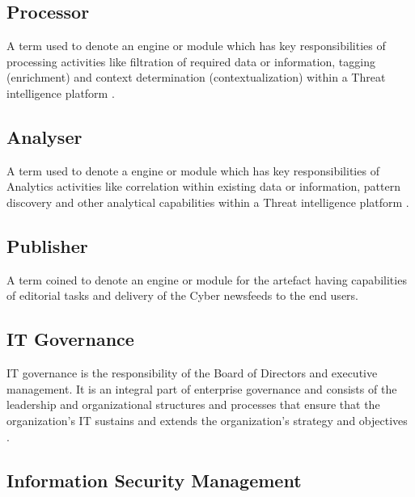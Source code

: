 
\subsection{Processor}	

A term used to denote an engine or module 
which has key responsibilities 
of processing activities like filtration
\citep{CanAtasoy2019} 
of required data or information, 
tagging (enrichment) and context determination (contextualization)
within a Threat intelligence platform
\citep{CanAtasoy2019}.

\subsection{Analyser}

A term used to denote a engine or module 
which has key responsibilities of 
Analytics
activities  
\citep{CanAtasoy2019} 
like correlation within existing data or information, 
pattern discovery 
and other analytical capabilities within a Threat intelligence platform
\citep{CanAtasoy2019}.

\subsection{Publisher}	

A term coined to denote an engine or module 
for the artefact 
having capabilities of editorial tasks and delivery 
of the Cyber newsfeeds to the end users.

\subsection{IT Governance}	

IT governance is the responsibility of 
the Board of Directors and executive management.
It is an integral part of enterprise governance and
consists of the leadership and organizational
structures and processes that ensure that the
organization’s IT sustains and extends the
organization’s strategy and objectives 
\citep{guldentops2009board}.

\subsection{Information Security Management}	

